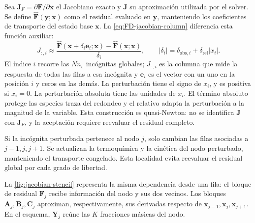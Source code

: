 \documentclass[12pt,a4paper,twoside,openany]{book}
\newcommand{\vect}[1]{\bm{#1}}
\newcommand{\mat}[1]{\bm{#1}}
\begin{document}
Sea \(\mat J_F=\partial\vect F/\partial\vect x\) el Jacobiano exacto y
\(\mat J\) su aproximación utilizada por el solver. Se define
\(\widehat{\vect F}(\vect y;\vect x)\) como el residual evaluado en
\(\vect y\), manteniendo los coeficientes de transporte del estado base
\(\vect x\). La \cref{eq:FD-jacobian-column} diferencia esta función auxiliar:
\begin{equation}
 J_{:,i}\approx
 \frac{\widehat{\vect F}(\vect x+\delta_i\vect e_i;\vect x)
       -\widehat{\vect F}(\vect x;\vect x)}{\delta_i},
 \qquad
 |\delta_i|=\delta_{\mathrm{abs},i}
       +\delta_{\mathrm{rel}}|x_i|.
 \label{eq:FD-jacobian-column}
\end{equation}
El índice \(i\) recorre las \(Nn_v\) incógnitas globales; \(J_{:,i}\) es la
columna que mide la respuesta de todas las filas a esa incógnita y
\(\vect e_i\) es el vector con un uno en la posición \(i\) y ceros en las demás.
La perturbación tiene el signo de \(x_i\), y es positiva si \(x_i=0\).
La perturbación absoluta tiene las unidades de \(x_i\). El término absoluto protege las especies traza del
redondeo y el relativo adapta la perturbación a la magnitud de la variable.
Esta construcción es quasi-Newton: no se identifica \(\mat J\) con
\(\mat J_F\), y la aceptación requiere reevaluar el residual completo.

Si la incógnita perturbada pertenece al nodo \(j\), solo cambian las filas
asociadas a \(j-1,j,j+1\). Se actualizan la termoquímica y la cinética del nodo
perturbado, manteniendo el transporte congelado. Esta localidad evita
reevaluar el residual global por cada grado de libertad.

La \cref{fig:jacobian-stencil} representa la misma dependencia desde una fila:
el bloque de residual \(\vect F_j\) recibe información del nodo y sus dos
vecinos. Los bloques \(\mat A_j,\mat B_j,\mat C_j\) aproximan,
respectivamente, sus derivadas respecto de
\(\vect x_{j-1},\vect x_j,\vect x_{j+1}\).
En el esquema, \(\vect Y_j\) reúne las \(K\) fracciones másicas del nodo.
\end{document}
